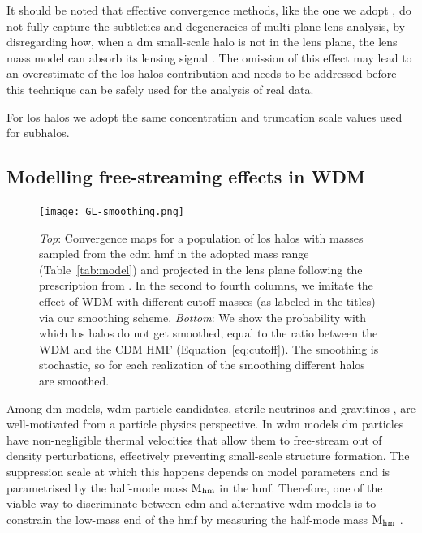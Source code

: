 It should be noted that effective convergence methods, like the one we adopt \citep{CaganSengul:2020nat}, do not fully capture the subtleties and degeneracies of multi-plane lens analysis, by disregarding how, when a \gls*{dm} small-scale halo is not in the lens plane, the lens mass model can absorb its lensing signal \citep{Fleury:2021tke, Amorisco:2021iim, He:2021rjd}. The omission of this effect may lead to an overestimate of the \gls*{los} halos contribution and needs to be addressed before this technique can be safely used for the analysis of real data.

For \gls*{los} halos we adopt the same concentration and truncation scale values used for subhalos.


\subsection{Modelling free-streaming effects in WDM}
\label{subsec:free-streaming}

\begin{figure}
    \centering
    \texttt{[image: GL-smoothing.png]}
    \caption{
    \textit{Top}: Convergence maps for a population of \gls*{los} halos with masses sampled from the \gls*{cdm} \gls*{hmf} in the adopted mass range (Table~\ref{tab:model}) and projected in the lens plane following the prescription from \cite{CaganSengul:2020nat}.
    In the second to fourth columns, we imitate the effect of WDM with different cutoff masses (as labeled in the titles) via our smoothing scheme. \textit{Bottom}: We show the probability with which \gls*{los} halos do not get smoothed, equal to the ratio between the WDM and the CDM HMF (Equation~\eqref{eq:cutoff}). The smoothing is stochastic, so for each realization of the smoothing different halos are smoothed.
    }
    \label{fig:smoothing}
\end{figure}

Among \gls*{dm} models, \gls*{wdm} particle candidates, sterile neutrinos \citep{Boyarsky:2018tvu} and gravitinos \citep{Bond:1982uy}, are well-motivated from a particle physics perspective. In \gls*{wdm} models \gls*{dm} particles have non-negligible thermal velocities that allow them to free-stream out of density perturbations, effectively preventing small-scale structure formation. The suppression scale at which this happens depends on model parameters and is parametrised by the half-mode mass $\mathrm{M_{hm}}$ in the \gls*{hmf}. Therefore, one of the viable way to discriminate between \gls*{cdm} and alternative \gls*{wdm} models is to constrain the low-mass end of the \gls*{hmf} by measuring the half-mode mass $\mathrm{M_{hm}}$ . 

